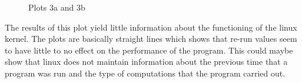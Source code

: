 \documentclass[11pt] {article}
\begin{document}
\begin {figure} [ht]
\begin {center}
\end {center}
\caption {Plots 3a and 3b}
\end {figure}

The results of this plot yield little information about the functioning of the linux kernel.
The plots are basically straight lines which shows that re-run values seem to have little to
no effect on the performance of the program. This could maybe show that linux does not 
maintain information about the previous time that a program was run and the type of computations
that the program carried out.
\end{document}
